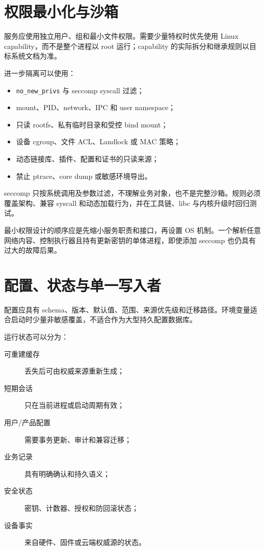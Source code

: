 \section{权限最小化与沙箱}

服务应使用独立用户、组和最小文件权限。需要少量特权时优先使用 Linux capability，而不是整个进程以 root 运行；capability 的实际拆分和继承规则以目标系统文档为准\cite{linux-capabilities-man}。

进一步隔离可以使用：

\begin{itemize}
  \item \texttt{no\_new\_privs} 与 seccomp syscall 过滤；
  \item mount、PID、network、IPC 和 user namespace；
  \item 只读 rootfs、私有临时目录和受控 bind mount；
  \item 设备 cgroup、文件 ACL、Landlock 或 MAC 策略；
  \item 动态链接库、插件、配置和证书的只读来源；
  \item 禁止 ptrace、core dump 或敏感环境导出。
\end{itemize}

seccomp 只按系统调用及参数过滤，不理解业务对象，也不是完整沙箱\cite{linux-seccomp-man}。规则必须覆盖架构、兼容 syscall 和动态加载行为，并在工具链、libc 与内核升级时回归测试。

最小权限设计的顺序应是先缩小服务职责和接口，再设置 OS 机制。一个解析任意网络内容、控制执行器且持有更新密钥的单体进程，即使添加 seccomp 也仍具有过大的故障后果。

\section{配置、状态与单一写入者}

配置应具有 schema、版本、默认值、范围、来源优先级和迁移路径。环境变量适合启动时少量非敏感覆盖，不适合作为大型持久配置数据库。

运行状态可以分为：

\begin{description}
  \item[可重建缓存] 丢失后可由权威来源重新生成；
  \item[短期会话] 只在当前进程或启动周期有效；
  \item[用户/产品配置] 需要事务更新、审计和兼容迁移；
  \item[业务记录] 具有明确确认和持久语义；
  \item[安全状态] 密钥、计数器、授权和防回滚状态；
  \item[设备事实] 来自硬件、固件或云端权威源的状态。
\end{description}

